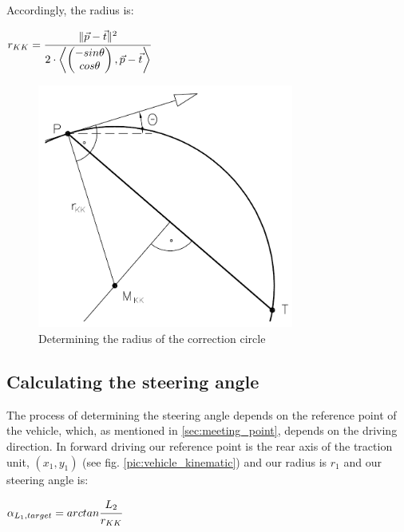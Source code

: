 Accordingly, the radius is:

\begin{center}
$ r_{KK}=
\cfrac{\| \vec{p} - \vec{t} \|^2}{2 \cdot \left \langle 
	\begin{pmatrix}
		-sin \theta \\
		cos \theta
	\end{pmatrix}
	, \vec{p} - \vec{t}
	\right \rangle
	}$
\end{center}

\begin{figure}[h]
\centering
\includegraphics[width=0.75\textwidth]{./Chapters/Figures/correction_circle_radius.png}
\caption{Determining the radius of the correction circle\label{pic:correction_circle_radius}}
\end{figure}

\subsection{Calculating the steering angle}
\label{sec:calculating_steering_angle}

The process of determining the steering angle depends on the reference point of the vehicle, which, as mentioned in \ref{sec:meeting_point}, depends on the driving direction. In forward driving our reference point is the rear axis of the traction unit, $(x_1,y_1)$ (see fig. \ref{pic:vehicle_kinematic}) and our radius is $r_1$ and our steering angle is:

\begin{center}
$ \alpha_{L_1,target} = arctan \cfrac{L_2}{r_{KK}} $
\end{center}


